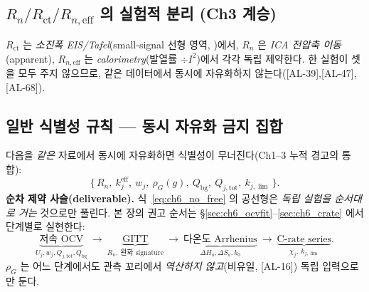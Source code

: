 \documentclass[11pt,a4paper]{article}
\newcommand{\eff}{\mathrm{eff}}
\newcommand{\bg}{\mathrm{bg}}
\newcommand{\tot}{\mathrm{tot}}
\newcommand{\ct}{\mathrm{ct}}
\newcommand{\AL}[1]{\textsf{[AL-#1]}}
\begin{document}
\subsection{$R_n/R_\ct/R_{n,\eff}$ 의 실험적 분리 (Ch3 계승)}\label{sec:ch6_threeR}
$R_\ct$ 는 \emph{소진폭 EIS/Tafel}(small-signal 선형 영역, \cite{bardfaulkner})에서, $R_n$ 은 \emph{ICA 전압축
이동}(apparent), $R_{n,\eff}$ 는 \emph{calorimetry}(발열률 $\div I^2$)에서 각각 독립 제약한다. 한 실험이 셋을 모두
주지 않으므로, 같은 데이터에서 동시에 자유화하지 않는다(\AL{39},\AL{47},\AL{68}).

\subsection{일반 식별성 규칙 — 동시 자유화 금지 집합}\label{sec:ch6_noFree}
다음을 \emph{같은} 자료에서 동시에 자유화하면 식별성이 무너진다(Ch1--3 누적 경고의 통합):
\begin{equation}
\{\,R_n,\ k_j^{\eff},\ w_j,\ \rho_G(g),\ Q_\bg,\ Q_{j,\tot},\ k_{j,\lim}\,\}.
\label{eq:ch6_no_free}
\end{equation}
\textbf{순차 제약 사슬(deliverable).} 식~\eqref{eq:ch6_no_free} 의 공선형은 \emph{독립 실험을 순서대로 거는} 것으로만
풀린다. 본 장의 권고 순서는 \S\ref{sec:ch6_ocvfit}--\ref{sec:ch6_crate} 에서 단계별로 실현한다:
\[
\underbrace{\text{저속 OCV}}_{U_j,w_j,Q_{j,\tot},Q_\bg}\ \to\ \underbrace{\text{GITT}}_{R_n,\ \text{완화 signature}}\ \to\
\underbrace{\text{다온도 Arrhenius}}_{\Delta H_a,\Delta S_a,k_0}\ \to\ \underbrace{\text{C-rate series}}_{\chi_j,\ k_{j,\lim}}.
\]
$\rho_G$ 는 어느 단계에서도 관측 꼬리에서 \emph{역산하지 않고}(비유일, \AL{16}) 독립 입력으로만 둔다.

\end{document}
